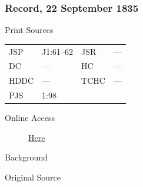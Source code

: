 		\subsubsection{Record, 22 September 1835}
			\label{EMS-1835-JS-22-SEP-1835}
			
			\begin{description}
				\item[Print Sources]
			\end{description}

				\begin{tabular}{p{0.5in}p{1in}p{0.5in}p{1in}}
				JSP	 	& J1:61--62		& JSR 		& --- \\
				DC	 	& --- 				& HC 		& --- \\
				HDDC 	& ---				& TCHC 		& --- \\
				PJS 	& 1:98			& 	 		&  \\
				\end{tabular}
			
			\begin{description}
				\item[Online Access] \href{https://www.josephsmithpapers.org/paper-summary/journal-1835-1836/2}{Here}
			\end{description}
			
			\begin{description}
				\item[Background]
			\end{description}
			
			
			\begin{description}
				\item[Original Source]
			\end{description}
			
			
